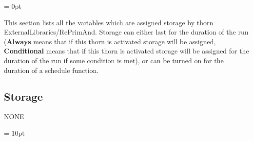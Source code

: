\parskip = 0pt


\noindent This section lists all the variables which are assigned storage by thorn ExternalLibraries/RePrimAnd.  Storage can either last for the duration of the run ({\bf Always} means that if this thorn is activated storage will be assigned, {\bf Conditional} means that if this thorn is activated storage will be assigned for the duration of the run if some condition is met), or can be turned on for the duration of a schedule function.


\subsection*{Storage}NONE

\vspace{5mm}\parskip = 10pt 

